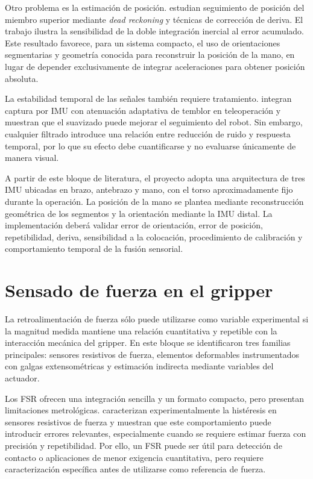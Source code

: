 Otro problema es la estimación de posición. \textcite{bai2023deadreckoning} estudian seguimiento de posición del miembro superior mediante \textit{dead reckoning} y técnicas de corrección de deriva. El trabajo ilustra la sensibilidad de la doble integración inercial al error acumulado. Este resultado favorece, para un sistema compacto, el uso de orientaciones segmentarias y geometría conocida para reconstruir la posición de la mano, en lugar de depender exclusivamente de integrar aceleraciones para obtener posición absoluta.

La estabilidad temporal de las señales también requiere tratamiento. \textcite{zhu2022tremor} integran captura por IMU con atenuación adaptativa de temblor en teleoperación y muestran que el suavizado puede mejorar el seguimiento del robot. Sin embargo, cualquier filtrado introduce una relación entre reducción de ruido y respuesta temporal, por lo que su efecto debe cuantificarse y no evaluarse únicamente de manera visual.

A partir de este bloque de literatura, el proyecto adopta una arquitectura de tres IMU ubicadas en brazo, antebrazo y mano, con el torso aproximadamente fijo durante la operación. La posición de la mano se plantea mediante reconstrucción geométrica de los segmentos y la orientación mediante la IMU distal. La implementación deberá validar error de orientación, error de posición, repetibilidad, deriva, sensibilidad a la colocación, procedimiento de calibración y comportamiento temporal de la fusión sensorial.

\section{Sensado de fuerza en el gripper}

La retroalimentación de fuerza sólo puede utilizarse como variable experimental si la magnitud medida mantiene una relación cuantitativa y repetible con la interacción mecánica del gripper. En este bloque se identificaron tres familias principales: sensores resistivos de fuerza, elementos deformables instrumentados con galgas extensométricas y estimación indirecta mediante variables del actuador.

Los FSR ofrecen una integración sencilla y un formato compacto, pero presentan limitaciones metrológicas. \textcite{paredesmadrid2018fsr} caracterizan experimentalmente la histéresis en sensores resistivos de fuerza y muestran que este comportamiento puede introducir errores relevantes, especialmente cuando se requiere estimar fuerza con precisión y repetibilidad. Por ello, un FSR puede ser útil para detección de contacto o aplicaciones de menor exigencia cuantitativa, pero requiere caracterización específica antes de utilizarse como referencia de fuerza.

